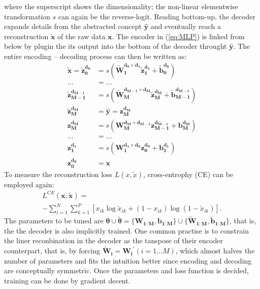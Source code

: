 where the superscript shows the dimensionality; the non-linear elementwise transformation $s$ can again be the reverse-logit. Reading bottom-up, the decoder expands details from the abstracted concept ${\boldsymbol{\hat{y}}}$ and eventually reach a reconstruction $\boldsymbol{\tilde{x}}$ of the raw data  $\boldsymbol{x}$. The encoder in (\ref{eq:MLP}) is linked from below by plugin the its output into the bottom of the decoder throught ${\boldsymbol{\hat{y}}}$. The entire encoding -- decoding process can then be written as:
\begin{equation} \label{eq:SDA}
\begin{split}
  \boldsymbol{\tilde{x}}=
  \boldsymbol{\tilde{z}_{0  }^{d_{0  }}} &= s(\boldsymbol{\tilde{W}_{1  }^{d_{0  } \times d_{1  }} \tilde{z}_{1  }^{d_{1  }}}+\boldsymbol{\tilde{b}_{0  }^{d_{0  }}}) \\
  ... &= ... \\
  \boldsymbol{\tilde{z}_{M-1}^{d_{M-1}}} &= s(\boldsymbol{\tilde{W}_{M  }^{d_{M-1} \times d_{M  }} \tilde{z}_{M  }^{d_{M  }}}+\boldsymbol{\tilde{b}_{M-1}^{d_{M-1}}}) \\
  \boldsymbol{\tilde{z}_{M  }^{d_{M  }}} &= \boldsymbol{\hat{y}} = \boldsymbol{z_{M  }^{d_{M  }}} \\
  \boldsymbol{z_{M  }^{d_{M  }}}         &= s(\boldsymbol{W_{M  }^{d_{M  } \times d_{M-1}} z_{M-1}^{d_{M-1}}}+\boldsymbol{b_{M  }^{d_{M  }}}) \\
  ... &= ... \\
  \boldsymbol{z_{1  }^{d_{1  }}}         &= s(\boldsymbol{W_{1  }^{d_{1  } \times d_{0  }} z_{0  }^{d_{0  }}}+\boldsymbol{b_{1  }^{d_{1  }}}) \\
  \boldsymbol{z_{0  }^{d_{0  }}}         &= \boldsymbol{x}
\end{split}
\end{equation}
To measure the reconstruction loss $L(x,\tilde{x})$, cross-entrophy (CE) can be employed again:
\begin{equation*}
\begin{split}
  L^{CE}(\boldsymbol{x},\boldsymbol{\tilde{x}}) = \\
  -\sum_{i=1}^N\sum_{k=1}^P[x_{ik}\log{\tilde{x}_{ik}}+(1-x_{ik})\log(1-\tilde{x}_{ik})].
\end{split}
\end{equation*}
The parameters to be tuned are $\boldsymbol{\theta} \cup \boldsymbol{\tilde{\theta}}=\{\boldsymbol{W_{1:M}},\boldsymbol{b_{1:M}}\} \cup \{\boldsymbol{\tilde{W}_{1:M}}, \boldsymbol{\tilde{b}_{1:M}}\}$, that is, the the decoder is also implicitly trained. One common practise is to constrain the liner reconbination in the decoder as the tanspose of their encoder counterpart, that is, by forcing $\boldsymbol{\tilde{W}_i}=\boldsymbol{W_i}^{\prime} (i=1 \ldots M)$, which almost halves the number of parameters and fits the intuition better since encoding and decoding are conceptually symmetric. Once the parameters and loss function is decided, training can be done by gradient decent.

